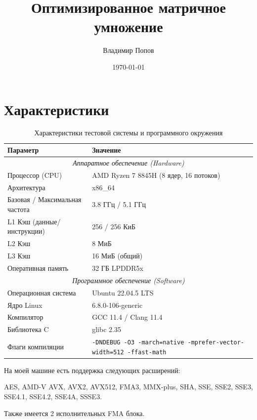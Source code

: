 \documentclass[12pt]{extarticle}
\title{Оптимизированное матричное умножение}
\author{Владимир Попов}
\date{\today}
\begin{document}
\maketitle

\newpage

\tableofcontents

\newpage

\section{Характеристики}

\begin{table}[ht]
\centering
\label{tab:system_specs}
\begin{tabular}{ll}
\toprule
\textbf{Параметр} & \textbf{Значение} \\
\midrule
\multicolumn{2}{c}{\textit{Аппаратное обеспечение (Hardware)}} \\
\midrule
Процессор (CPU) & AMD Ryzen 7 8845H (8 ядер, 16 потоков) \\
Архитектура & x86\_64 \\
Базовая / Максимальная частота & 3.8 ГГц / 5.1 ГГц \\
L1 Кэш (данные/инструкции) & 256 / 256 КиБ \\
L2 Кэш & 8 МиБ \\
L3 Кэш & 16 МиБ (общий) \\
Оперативная память & 32 ГБ LPDDR5x \\
\midrule
\multicolumn{2}{c}{\textit{Программное обеспечение (Software)}} \\
\midrule
Операционная система & Ubuntu 22.04.5 LTS \\
Ядро Linux & 6.8.0-106-generic \\
Компилятор & GCC 11.4 / Clang 11.4 \\
Библиотека C & glibc 2.35 \\
Флаги компиляции & \texttt{-DNDEBUG -O3 -march=native -mprefer-vector-width=512 -ffast-math} \\
\bottomrule
\end{tabular}

\caption{Характеристики тестовой системы и программного окружения}
\end{table}

На моей машине есть поддержка следующих расширений:

AES, AMD-V  AVX, AVX2, AVX512, FMA3, MMX-plus, SHA, SSE, SSE2, SSE3, SSE4.1, SSE4.2, SSE4A, SSSE3.

Также имеется 2 исполнительных FMA блока.
\end{document}
